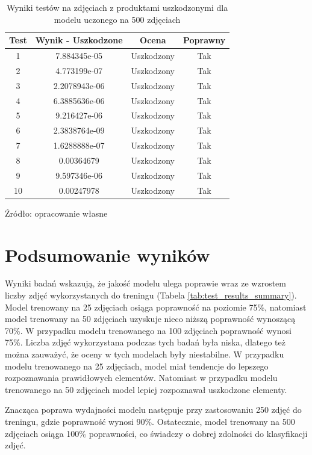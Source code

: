 \begin{table}[H]
\centering
\caption{Wyniki testów na zdjęciach z produktami uszkodzonymi dla modelu uczonego na 500 zdjęciach}
\begin{tabular}{|c|c|c|c|}
\hline
\textbf{Test} & \textbf{Wynik - Uszkodzone} & \textbf{Ocena} & \textbf{Poprawny} \\ \hline
1  & 7.884345e-05 & Uszkodzony & Tak  \\ \hline
2  & 4.773199e-07 & Uszkodzony & Tak \\ \hline
3  & 2.2078943e-06 & Uszkodzony & Tak \\ \hline
4  & 6.3885636e-06 & Uszkodzony & Tak \\ \hline
5  & 9.216427e-06 & Uszkodzony & Tak \\ \hline
6  & 2.3838764e-09 & Uszkodzony & Tak  \\ \hline
7  & 1.6288888e-07 & Uszkodzony & Tak \\ \hline
8 & 0.00364679 & Uszkodzony & Tak \\ \hline
9 & 9.597346e-06 & Uszkodzony & Tak \\ \hline
10 & 0.00247978 & Uszkodzony & Tak \\ \hline
\end{tabular}
\begin{center}
\footnotesize{Źródło: opracowanie własne}
\end{center}
\label{tab:test_results_uszkodzone_500}
\end{table}

\section{Podsumowanie wyników}

Wyniki badań wskazują, że jakość modelu ulega poprawie wraz ze wzrostem liczby zdjęć wykorzystanych do treningu (Tabela \ref{tab:test_results_summary}). Model trenowany na 25 zdjęciach osiąga poprawność na poziomie 75\%, natomiast model trenowany na 50 zdjęciach uzyskuje nieco niższą poprawność wynoszącą 70\%. W przypadku modelu trenowanego na 100 zdjęciach poprawność wynosi 75\%. Liczba zdjęć wykorzystana podczas tych badań była niska, dlatego też można zauważyć, że oceny w tych modelach były niestabilne. W przypadku modelu trenowanego na 25 zdjęciach, model miał tendencje do lepszego rozpoznawania prawidłowych elementów. Natomiast w przypadku modelu trenowanego na 50 zdjęciach model lepiej rozpoznawał uszkodzone elementy.

Znacząca poprawa wydajności modelu następuje przy zastosowaniu 250 zdjęć do treningu, gdzie poprawność wynosi 90\%. Ostatecznie, model trenowany na 500 zdjęciach osiąga 100\% poprawności, co świadczy o dobrej zdolności do klasyfikacji zdjęć.

